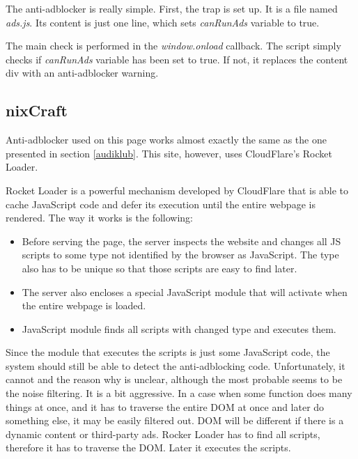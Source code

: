 

The anti-adblocker is really simple. First, the trap is set up. It is a file named \emph{ads.js}.
Its content is just one line, which sets \emph{canRunAds} variable to true.

The main check is performed in the \emph{window.onload} callback. The script simply checks
if \emph{canRunAds} variable has been set to true. If not, it replaces the content div with an anti-adblocker warning.


\subsection{nixCraft}

Anti-adblocker used on this page works almost exactly the same as the one presented in section \ref{audiklub}.
This site, however, uses CloudFlare's Rocket Loader.  

Rocket Loader is a powerful mechanism 
 developed by CloudFlare that is able to cache JavaScript code and defer its execution 
until the entire webpage is rendered. The way it works is the following: 
\begin{itemize}
  \item  Before serving the page, the server inspects the website and changes all JS scripts 
            to some type not identified by the browser as JavaScript. 
            The type also has  to be unique so that those scripts are easy to find later.
  \item The server also encloses a special JavaScript module that will activate when the entire webpage is loaded.
  \item JavaScript module finds all scripts with changed type and executes them.
\end{itemize}

Since the module that executes the scripts is just some JavaScript code, the system should still be able
to detect the anti-adblocking code. Unfortunately, it cannot and the reason why is unclear, although 
the most probable seems to be the noise filtering. It is a bit aggressive. In a case when some function
does many things at once, and it has to traverse the entire DOM at once and later do something else, 
it may be easily filtered out. DOM will be different if there is a dynamic content or third-party ads.
Rocker Loader has to find all scripts, therefore it has to traverse the DOM. Later it executes the scripts.

